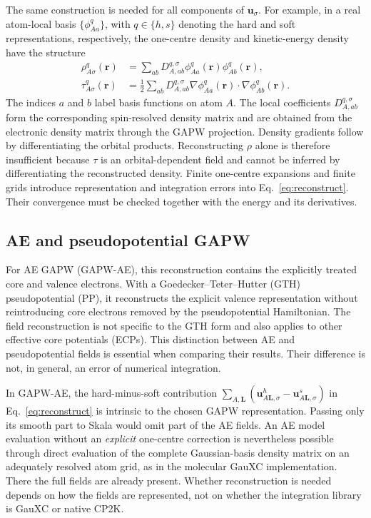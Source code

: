 \documentclass[10pt,a4paper,twocolumn]{article}
\newcommand{\uvec}{\boldsymbol{u}}
\begin{document}
The same construction is needed for all components of $\uvec_\sigma$. For example, in a real atom-local basis $\{\phi^q_{Aa}\}$, with $q\in\{h,s\}$ denoting the hard and soft representations, respectively, the one-centre density and kinetic-energy density have the structure
\begin{align}
 \rho^q_{A\sigma}(\mathbf r)&=\sum_{ab}D^{q,\sigma}_{A,ab}
                    \phi^q_{Aa}(\mathbf r)\phi^q_{Ab}(\mathbf r),\nonumber\\
 \tau^q_{A\sigma}(\mathbf r)&=\tfrac12\sum_{ab}D^{q,\sigma}_{A,ab}
                \nabla\phi^q_{Aa}(\mathbf r)\!\cdot\!\nabla\phi^q_{Ab}(\mathbf r).
 \label{eq:one-centre-fields}
\end{align}
The indices $a$ and $b$ label basis functions on atom $A$. The local coefficients $D^{q,\sigma}_{A,ab}$ form the corresponding spin-resolved density matrix and are obtained from the electronic density matrix through the GAPW projection. Density gradients follow by differentiating the orbital products. Reconstructing $\rho$ alone is therefore insufficient because $\tau$ is an orbital-dependent field and cannot be inferred by differentiating the reconstructed density. Finite one-centre expansions and finite grids introduce representation and integration errors into Eq.~\eqref{eq:reconstruct}. Their convergence must be checked together with the energy and its derivatives.

\subsection{AE and pseudopotential GAPW}

For AE GAPW (GAPW-AE), this reconstruction contains the explicitly treated core and valence electrons. With a Goedecker--Teter--Hutter (GTH) pseudopotential (PP), it reconstructs the explicit valence representation without reintroducing core electrons removed by the pseudopotential Hamiltonian.\cite{Goedecker1996} The field reconstruction is not specific to the GTH form and also applies to other effective core potentials (ECPs). This distinction between AE and pseudopotential fields is essential when comparing their results. Their difference is not, in general, an error of numerical integration.

In GAPW-AE, the hard-minus-soft contribution $\sum_{A,\mathbf L}(\uvec^h_{A\mathbf L,\sigma}-\uvec^s_{A\mathbf L,\sigma})$ in Eq.~\eqref{eq:reconstruct} is intrinsic to the chosen GAPW representation. Passing only its smooth part to Skala would omit part of the AE fields. An AE model evaluation without an \emph{explicit} one-centre correction is nevertheless possible through direct evaluation of the complete Gaussian-basis density matrix on an adequately resolved atom grid, as in the molecular GauXC implementation. There the full fields are already present. Whether reconstruction is needed depends on how the fields are represented, not on whether the integration library is GauXC or native CP2K.
\end{document}
